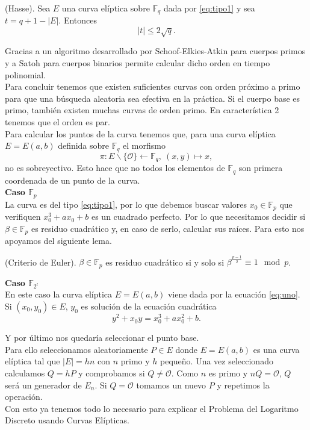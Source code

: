 \begin{teorema}
	(Hasse). Sea $E$ una curva elíptica sobre $\mathbb{F}_q$ dada por \eqref{eq:tipo1} y sea $t=q+1-|E|$. Entonces
	$$
		|t|\leq2\sqrt{q}.
	$$
\end{teorema}
Gracias a un algoritmo desarrollado por Schoof-Elkies-Atkin para cuerpos primos y a Satoh para cuerpos binarios permite calcular dicho orden en tiempo polinomial.\\
Para concluir tenemos que existen suficientes curvas con orden próximo a primo para que una búsqueda aleatoria sea efectiva en la práctica. Si el cuerpo base es primo, también existen muchas curvas de orden primo. En característica 2 tenemos que el orden es par.\\

Para calcular los puntos de la curva tenemos que, para una curva elíptica $E=E(a,b)$ definida sobre $\mathbb{F}_q$ el morfismo
$$
	\pi:E\backslash\{\mathcal{O}\}\leftarrow\mathbb{F}_q,\: (x,y)\mapsto x,
$$
no es sobreyectivo. Esto hace que no todos los elementos de $\mathbb{F}_q$ son primera coordenada de un punto de la curva.\\

\textbf{Caso $\mathbb{F}_p$}\\
La curva es del tipo \eqref{eq:tipo1}, por lo que debemos buscar valores $x_0\in \mathbb{F}_p$ que verifiquen $x_0^3+ax_0+b$ es un cuadrado perfecto. Por lo que necesitamos decidir si $\beta\in\mathbb{F}_p$ es residuo cuadrático y, en caso de serlo, calcular sus raíces. Para esto nos apoyamos del siguiente lema. 
\begin{lema}
		(Criterio de Euler). $\beta \in \mathbb{F}_p$ es residuo cuadrático si y solo si $\beta^{\frac{p-1}{2}}\equiv 1 \mod p$.
\end{lema}
\textbf{Caso $\mathbb{F}_{2^l}$}\\
En este caso la curva elíptica $E=E(a,b)$ viene dada por la ecuación \eqref{eq:uno}. Si $(x_0,y_0)\in E$, $y_0$ es solución de la ecuación cuadrática
$$
	y^2+x_0y=x_0^3+ax_0^2+b.
$$

Y por último nos quedaría seleccionar el punto base.\\
Para ello seleccionamos aleatoriamente $P\in E$ donde $E=E(a,b)$ es una curva elíptica tal que $|E|=hn$ con $n$ primo y $h$ pequeño. Una vez seleccionado calculamos $Q=hP$ y comprobamos si $Q\neq\mathcal{O}$. Como $n$ es primo y $nQ=\mathcal{O}$, $Q$ será un generador de $E_n$. Si $Q=\mathcal{O}$ tomamos un nuevo $P$ y repetimos la operación.\\
Con esto ya tenemos todo lo necesario para explicar el Problema del Logaritmo Discreto usando Curvas Elípticas.
